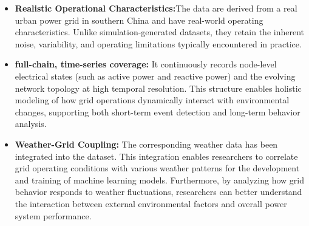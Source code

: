 \documentclass[12pt]{article}
\begin{document}
\begin{itemize}
    \item \textbf{Realistic Operational Characteristics:}The data are derived from a real urban power grid in southern China and have real-world operating characteristics. Unlike simulation-generated datasets, they retain the inherent noise, variability, and operating limitations typically encountered in practice.
    \item \textbf{full-chain, time-series coverage:} It continuously records node-level electrical states (such as active power and reactive power) and the evolving network topology at high temporal resolution. This structure enables holistic modeling of how grid operations dynamically interact with environmental changes, supporting both short-term event detection and long-term behavior analysis.
    \item \textbf{Weather-Grid Coupling:} The corresponding weather data has been integrated into the dataset. This integration enables researchers to correlate grid operating conditions with various weather patterns for the development and training of machine learning models. Furthermore, by analyzing how grid behavior responds to weather fluctuations, researchers can better understand the interaction between external environmental factors and overall power system performance.
\end{itemize}

\end{document}
